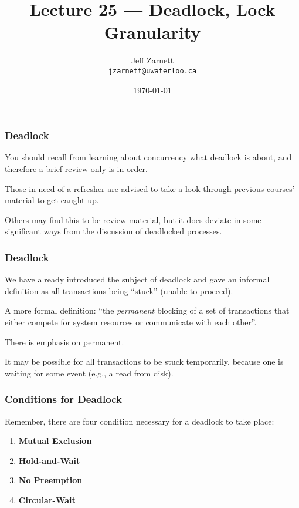 

\title{Lecture 25 --- Deadlock, Lock Granularity}

\author{Jeff Zarnett \\ \small \texttt{jzarnett@uwaterloo.ca}}
\date{\today}




\begin{frame}
  \titlepage

 \end{frame}

\begin{frame}
\frametitle{Deadlock}

You should recall from learning about concurrency what deadlock is about, and therefore a brief review only is in order. 

Those in need of a refresher are advised to take a look through previous courses' material to get caught up. 

Others may find this to be review material, but it does deviate in some significant ways from the discussion of deadlocked processes.

\end{frame}

\begin{frame}
\frametitle{Deadlock}
We have already introduced the subject of deadlock and gave an informal definition as all transactions being ``stuck'' (unable to proceed). 

A more formal definition: ``the \textit{permanent} blocking of a set of transactions that either compete for system resources or communicate with each other''. 

There is emphasis on permanent. 

It may be possible for all transactions to be stuck temporarily, because one is waiting for some event (e.g., a read from disk).

\end{frame}

\begin{frame}
\frametitle{Conditions for Deadlock}
Remember, there are four condition necessary for a deadlock to take place:

\begin{enumerate}
	\item \textbf{Mutual Exclusion}
	\item \textbf{Hold-and-Wait}
	\item \textbf{No Preemption}
	\item \textbf{Circular-Wait}
\end{enumerate}

\end{frame}

